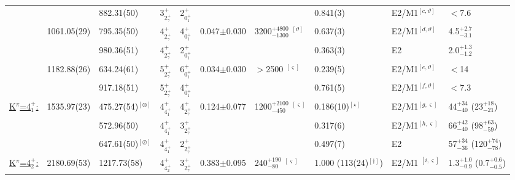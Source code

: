 \begin{landscape}
\begin{center}
\begin{longtable}{cllcccllll}
                                  &             &  882.31(50)               & 3$^+_{2^+_\gamma}$ & 2$^+_{0^+_1}$ &&                                                            & 0.841(3)            & E2/M1$^{[c,\vartheta]}$  & $<$7.6                  \\ 
                                  & 1061.05(29) &  795.35(50)               & 4$^+_{2^+_\gamma}$ & 4$^+_{0^+_1}$ &0.047$\pm$0.030& 3200$^{+4800}_{-1300}$ $^{[\vartheta]}$        & 0.637(3)            & E2/M1$^{[d,\vartheta]}$  & 4.5$^{+2.7}_{-3.1}$ \\
                                  &             &  980.36(51)               & 4$^+_{2^+_\gamma}$ & 2$^+_{0^+_1}$ &&                                                            & 0.363(3)            & E2                    & 2.0$^{+1.3}_{-1.2}$             \\ 
                                  & 1182.88(26) &  634.24(61)               & 5$^+_{2^+_\gamma}$ & 6$^+_{0^+_1}$ &0.034$\pm$0.030& $>$2500 $^{[\varsigma]}$                        &0.239(5)             & E2/M1$^{[e,\vartheta]}$  & $<$14   \\
                                  &             &  917.18(51)               & 5$^+_{2^+_\gamma}$ & 4$^+_{0^+_1}$ &&                                                            &0.761(5)             & E2/M1$^{[f,\vartheta]}$  & $<$7.3   \\ \hline
\underline{K$^\pi$=4$^+_1$:}      & 1535.97(23) &  475.27(54)$^{[\otimes]}$& 4$^+_{4^+_1}$& 4$^+_{2^+_\gamma}$ &0.124$\pm$0.077& 1200$^{+2100}_{-450}$ $^{[\varsigma]}$           &0.186(10)$^{[\star]}$& E2/M1$^{[g,\varsigma]}$    & 44$^{+34}_{-40}$ (23$^{+18}_{-21}$)       \\
                                  &             &  572.96(50)               & 4$^+_{4^+_1}$& 3$^+_{2^+_\gamma}$ &&                                                             &0.317(6)             & E2/M1$^{[h,\varsigma]}$    & 66$^{+42}_{-40}$ (98$^{+63}_{-59}$)       \\
                                  &             &  647.61(50)$^{[\oslash]}$ & 4$^+_{4^+_1}$& 2$^+_{2^+_\gamma}$ &&                                                             &0.497(7)             & E2                     & 57$^{+34}_{-36}$ (120$^{+74}_{-78}$)       \\ \hline
\underline{K$^\pi$=4$^+_2$:}      & 2180.69(53) &  1217.73(58)              & 4$^+_{4^+_2}$ & 3$^+_{2^+_\gamma}$ &0.383$\pm$0.095& 240$^{+190}_{-80}$ $^{[\varsigma]}$             &1.000  (113(24)$^{[\dagger]}$)              & E2/M1 $^{[i,\varsigma]}$      & 1.3$^{+1.0}_{-0.9}$  (0.7$^{+0.6}_{-0.5}$)      \\ 

\end{longtable}
\end{center}
\end{landscape}

